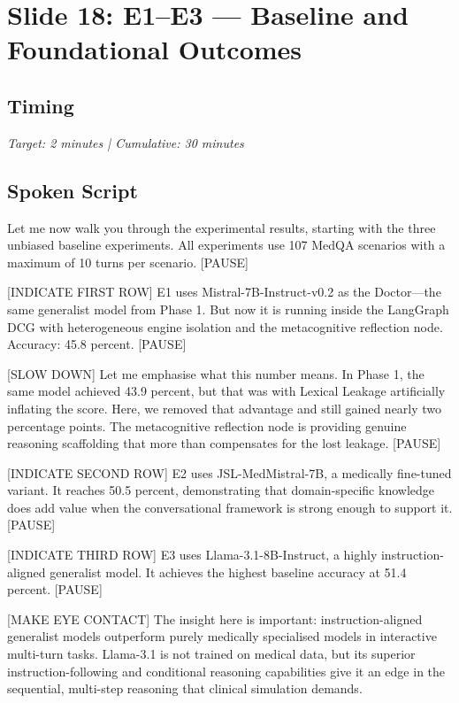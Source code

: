 \documentclass[12pt]{article}
\begin{document}
  \section{Slide 18: E1--E3 --- Baseline and Foundational Outcomes}

  \subsection*{Timing}
  \textit{Target: 2 minutes | Cumulative: 30 minutes}

  \subsection*{Spoken Script}
  \begin{spokenbox}
   Let me now walk you through the experimental results, starting with the three unbiased baseline experiments. All experiments use 107 MedQA scenarios with a maximum of 10 turns per scenario. [PAUSE]

  [INDICATE FIRST ROW] E1 uses Mistral-7B-Instruct-v0.2 as the Doctor---the same generalist model from Phase 1. But now it is running inside the LangGraph DCG with heterogeneous engine isolation and the metacognitive reflection node. Accuracy: 45.8 percent. [PAUSE]

  [SLOW DOWN] Let me emphasise what this number means. In Phase 1, the same model achieved 43.9 percent, but that was with Lexical Leakage artificially inflating the score. Here, we removed that advantage and still gained nearly two percentage points. The metacognitive reflection node is providing genuine reasoning scaffolding that more than compensates for the lost leakage. [PAUSE]

  [INDICATE SECOND ROW] E2 uses JSL-MedMistral-7B, a medically fine-tuned variant. It reaches 50.5 percent, demonstrating that domain-specific knowledge does add value when the conversational framework is strong enough to support it. [PAUSE]

  [INDICATE THIRD ROW] E3 uses Llama-3.1-8B-Instruct, a highly instruction-aligned generalist model. It achieves the highest baseline accuracy at 51.4 percent. [PAUSE]

  [MAKE EYE CONTACT] The insight here is important: instruction-aligned generalist models outperform purely medically specialised models in interactive multi-turn tasks. Llama-3.1 is not trained on medical data, but its superior instruction-following and conditional reasoning capabilities give it an edge in the sequential, multi-step reasoning that clinical simulation demands.
  \end{spokenbox}
\end{document}
